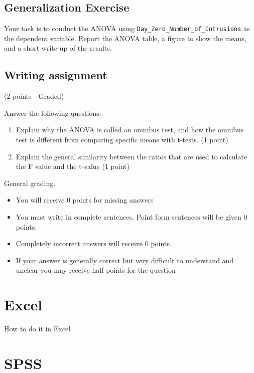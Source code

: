 \documentclass[]{book}
\providecommand{\tightlist}{%
  \setlength{\itemsep}{0pt}\setlength{\parskip}{0pt}}
\begin{document}
\subsection{Generalization Exercise}\label{generalization-exercise-7}

Your task is to conduct the ANOVA using
\texttt{Day\_Zero\_Number\_of\_Intrusions} as the dependent variable.
Report the ANOVA table, a figure to show the means, and a short write-up
of the results.

\subsection{Writing assignment}\label{writing-assignment-7}

(2 points - Graded)

Answer the following questions:

\begin{enumerate}
\def\labelenumi{\arabic{enumi}.}
\item
  Explain why the ANOVA is called an omnibus test, and how the omnibus
  test is different from comparing specific means with t-tests. (1
  point)
\item
  Explain the general similarity between the ratios that are used to
  calculate the F value and the t-value (1 point)
\end{enumerate}

General grading.

\begin{itemize}
\tightlist
\item
  You will receive 0 points for missing answers
\item
  You must write in complete sentences. Point form sentences will be
  given 0 points.
\item
  Completely incorrect answers will receive 0 points.
\item
  If your answer is generally correct but very difficult to understand
  and unclear you may receive half points for the question
\end{itemize}

\section{Excel}\label{excel-8}

How to do it in Excel

\section{SPSS}\label{spss-8}
\end{document}
